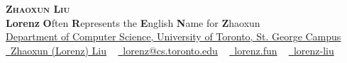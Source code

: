 \documentclass[letterpaper,11pt]{article}
\begin{document}

\begin{center}
    {\Huge \scshape \textbf{Zhaoxun Liu}} \\ \vspace{5pt}
    {\Large \textbf{Lorenz}} {\textbf{O}ften \textbf{R}epresents the \textbf{E}nglish \textbf{N}ame for \textbf{Z}haoxun} \\ \vspace{5pt}
    \href{https://web.cs.toronto.edu/}{Department of Computer Science, University of Toronto, St. George Campus} \\ \vspace{2pt}
    \small \href{https://www.linkedin.com/in/zhaoxun-lorenz-liu/}{\raisebox{-0.1\height}\faLinkedin\ Zhaoxun (Lorenz) Liu} ~ \href{mailto:lorenz@cs.toronto.edu}{\raisebox{-0.2\height}\faEnvelope\  {lorenz@cs.toronto.edu}} ~ 
    \href{https://lorenz.fun/}{\raisebox{-0.2\height}\faHome\ {lorenz.fun}}  ~
    \href{https://github.com/lorenz-liu}{\raisebox{-0.2\height}\faGithub\ {lorenz-liu}}
    \vspace{-8pt}
\end{center}


\end{document}
